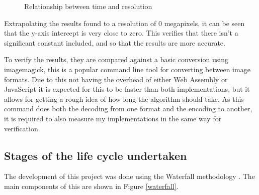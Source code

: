 \documentclass[12pt,a4paper]{article}
\begin{document}

\begin{figure}[H]
    \centering
    \caption{Relationship between time and resolution}

\end{figure}

Extrapolating the results found to a resolution of 0 megapixels, it can be seen that the y-axis intercept is very close to zero. This verifies that there isn't a significant constant included, and so that the results are more accurate.


To verify the results, they are compared against a basic conversion using imagemagick, this is a popular command line tool for converting between image formats. Due to this not having the overhead of either Web Assembly or JavaScript it is expected for this to be faster than both implementations, but it allows for getting a rough idea of how long the algorithm should take. As this command does both the decoding from one format and the encoding to another, it is required to also measure my implementations in the same way for verification.

\subsection{Stages of the life cycle undertaken}

The development of this project was done using the Waterfall methodology \cite{royce1987managing}. The main components of this are shown in Figure \ref{waterfall}.
\end{document}
